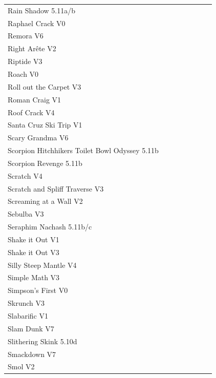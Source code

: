 \begin{flushleft}
\begin{center}
\begin{supertabular}{p{0.76\linewidth}p{0.08\linewidth}}
Rain Shadow 5.11a/b & \pageref{rt:Rain Shadow} \\
Raphael Crack V0 & \pageref{rt:Raphael Crack} \\
Remora V6 & \pageref{rt:Remora} \\
Right Arête V2 & \pageref{rt:PR_1} \\
Riptide V3 & \pageref{rt:Riptide} \\
Roach V0 & \pageref{rt:Roach} \\
Roll out the Carpet V3 & \pageref{rt:Roll out the Carpet} \\
Roman Craig V1 & \pageref{rt:Roman Craig} \\
Roof Crack V4 & \pageref{rt:Roof Crack} \\
Santa Cruz Ski Trip V1 & \pageref{rt:Santa Cruz Ski Trip} \\
Scary Grandma V6 & \pageref{rt:Scary Grandma} \\
Scorpion Hitchhikers Toilet Bowl Odyssey 5.11b & \pageref{rt:Scorpion Hitchhikers Toilet Bowl Odyssey} \\
Scorpion Revenge 5.11b & \pageref{rt:Scorpion Revenge} \\
Scratch V4 & \pageref{rt:Scratch} \\
Scratch and Spliff Traverse V3 & \pageref{rt:Scratch and Spliff Traverse} \\
Screaming at a Wall V2 & \pageref{rt:Screaming at a Wall} \\
Sebulba V3 & \pageref{vr:Sebulba} \\
Seraphim Nachash 5.11b/c & \pageref{rt:Seraphim Nachash} \\
Shake it Out V1 & \pageref{rt:Shake it Out Frank} \\
Shake it Out V3 & \pageref{vr:Shake it Out} \\
Silly Steep Mantle V4 & \pageref{rt:Silly Steep Mantle} \\
Simple Math V3 & \pageref{rt:Simple Math} \\
Simpson's First V0 & \pageref{rt:Simpson's First} \\
Skrunch V3 & \pageref{rt:Skrunch} \\
Slabarific V1 & \pageref{rt:Slabarific} \\
Slam Dunk V7 & \pageref{rt:Slam Dunk} \\
Slithering Skink 5.10d & \pageref{rt:Slithering Skink} \\
Smackdown V7 & \pageref{rt:Smackdown} \\
Smol V2 & \pageref{rt:Smol} \\

\end{supertabular}
\end{center}
\end{flushleft}
